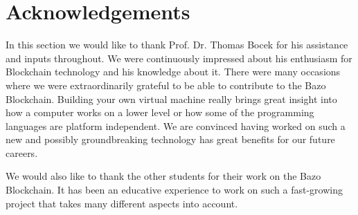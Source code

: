 \chapter*{Acknowledgements}
\thispagestyle{main} %
	In this section we would like to thank Prof. Dr. Thomas Bocek for his assistance and inputs throughout. We were continuously impressed about his enthusiasm for Blockchain technology and his knowledge about it. There were many occasions where we were extraordinarily grateful to be able to contribute to the Bazo Blockchain. Building your own virtual machine really brings great insight into how a computer works on a lower level or how some of the programming languages are platform independent. We are convinced having worked on such a new and possibly groundbreaking technology has great benefits for our future careers.
	
	We would also like to thank the other students for their work on the Bazo Blockchain. It has been an educative experience to work on such a fast-growing project that takes many different aspects into account.